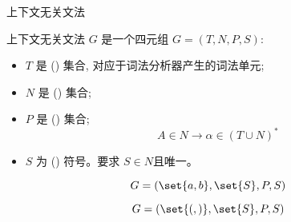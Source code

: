 
\begin{frame}{}

  \begin{center}
    上下文无关文法
  \end{center}
\end{frame}

\begin{frame}{}
  \begin{definition}
    上下文无关文法 $G$ 是一个四元组 $G = (T, N, P, S)$:
    \vspace{0.30cm}

    \begin{itemize}
      \setlength{\itemsep}{8pt}
      \item $T$ 是 () 集合, 对应于词法分析器产生的词法单元;
      \item $N$ 是 () 集合;
      \item $P$ 是 () 集合;
        \[
          \boxed{A \in N \longrightarrow \alpha \in (T \cup N)^{\ast}}
        \]
        \vspace{-0.60cm}
      \item $S$ 为 () 符号。要求 $S \in N$且唯一。
    \end{itemize}
  \end{definition}
\end{frame}

\begin{frame}{}
  \[
    G = (\set{a,b}, \set{S}, P, S)
  \]

  
\end{frame}

\begin{frame}{}
  \[
    G = (\set{(,)}, \set{S}, P, S)
  \]

  
\end{frame}

